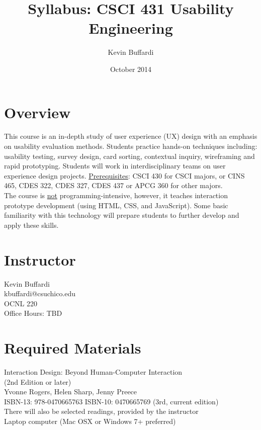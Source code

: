 \documentclass[12pt]{article}
\title{Syllabus: CSCI 431 Usability Engineering}
\author{Kevin Buffardi}
\date{October 2014}
\begin{document}
  \maketitle
  \section*{Overview}	 
  \noindent
  This course is an in-depth study of user experience (UX) design with an emphasis on usability evaluation methods. Students practice hands-on techniques including: usability testing, survey design, card sorting, contextual inquiry, wireframing and rapid prototyping. Students will work in interdisciplinary teams on user experience design projects.
  \newline
  \newline
  \underline{Prerequisites}: CSCI 430 for CSCI majors, or CINS 465, CDES 322, CDES 327, CDES 437 or APCG 360 for other majors. \\
  \newline
  The course is \underline{not} programming-intensive, however, it teaches interaction prototype development (using HTML, CSS, and JavaScript). Some basic familiarity with this technology will prepare students to further develop and apply these skills. 
  
  \section*{Instructor}
  \noindent
  Kevin Buffardi \\
  kbuffardi@csuchico.edu \\
  OCNL 220 \\
  Office Hours: TBD\\

  \section*{Required Materials}
  \noindent
  Interaction Design: Beyond Human-Computer Interaction \\
  (2nd Edition or later) \\
  Yvonne Rogers, Helen Sharp, Jenny Preece \\
  ISBN-13: 978-0470665763  ISBN-10: 0470665769 (3rd, current edition) \\
  \newline
  There will also be selected readings, provided by the instructor \\
  \newline
  Laptop computer (Mac OSX or Windows 7+ preferred)
\end{document}
